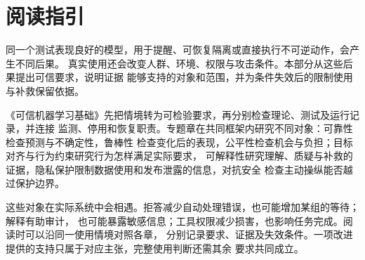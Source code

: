 \chapter*{阅读指引}

同一个测试表现良好的模型，用于提醒、可恢复隔离或直接执行不可逆动作，会产生不同后果。
真实使用还会改变人群、环境、权限与攻击条件。本部分从这些后果提出可信要求，说明证据
能够支持的对象和范围，并为条件失效后的限制使用与补救保留依据。

《可信机器学习基础》先把情境转为可检验要求，再分别检查理论、测试及运行记录，并连接
监测、停用和恢复职责。专题章在共同框架内研究不同对象：可靠性检查预测与不确定性，鲁棒性
检查变化后的表现，公平性检查机会与负担；目标对齐与行为约束研究行为怎样满足实际要求，
可解释性研究理解、质疑与补救的证据，隐私保护限制数据使用和发布泄露的信息，对抗安全
检查主动操纵能否越过保护边界。

这些对象在实际系统中会相遇。拒答减少自动处理错误，也可能增加某组的等待；解释有助审计，
也可能暴露敏感信息；工具权限减少损害，也影响任务完成。阅读时可以沿同一使用情境对照各章，
分别记录要求、证据及失效条件。一项改进提供的支持只属于对应主张，完整使用判断还需其余
要求共同成立。
